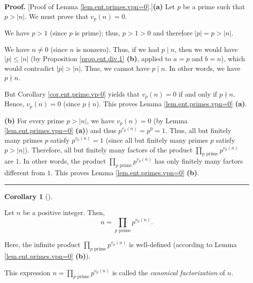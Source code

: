 \documentclass[numbers=enddot,12pt,final,onecolumn,notitlepage]{scrartcl}%
\numberwithin{exer}{subsection}
\theoremstyle{definition}
\newtheorem{coro}[theo]{Corollary}
\newenvironment{corollary}[1][]
{\begin{coro}[#1]\begin{leftbar}}
{\end{leftbar}\end{coro}}
\newenvironment{proof}[1][Proof]{\noindent\textbf{#1.} }{\ \rule{0.5em}{0.5em}}
\let\prodnonlimits\prod
\renewcommand{\prod}{\prodnonlimits\limits}
\begin{document}
\begin{proof}
[Proof of Lemma \ref{lem.ent.primes.vpn=0}.]\textbf{(a)} Let $p$ be a prime
such that $p>\left\vert n\right\vert $. We must prove that $v_{p}\left(
n\right)  =0$.

We have $p>1$ (since $p$ is prime); thus, $p>1>0$ and therefore $\left\vert
p\right\vert =p>\left\vert n\right\vert $.

We have $n\neq0$ (since $n$ is nonzero). Thus, if we had $p\mid n$, then we
would have $\left\vert p\right\vert \leq\left\vert n\right\vert $ (by
Proposition \ref{prop.ent.div.1} \textbf{(b)}, applied to $a=p$ and $b=n$),
which would contradict $\left\vert p\right\vert >\left\vert n\right\vert $.
Thus, we cannot have $p\mid n$. In other words, we have $p\nmid n$.

But Corollary \ref{cor.ent.prime.vp-0} yields that $v_{p}\left(  n\right)  =0$
if and only if $p\nmid n$. Hence, $v_{p}\left(  n\right)  =0$ (since $p\nmid
n$). This proves Lemma \ref{lem.ent.primes.vpn=0} \textbf{(a)}.

\textbf{(b)} For every prime $p>\left\vert n\right\vert $, we have
$v_{p}\left(  n\right)  =0$ (by Lemma \ref{lem.ent.primes.vpn=0} \textbf{(a)})
and thus $p^{v_{p}\left(  n\right)  }=p^{0}=1$. Thus, all but finitely many
primes $p$ satisfy $p^{v_{p}\left(  n\right)  }=1$ (since all but finitely
many primes $p$ satisfy $p>\left\vert n\right\vert $). Therefore, all but
finitely many factors of the product $\prod_{p\text{ prime}}p^{v_{p}\left(
n\right)  }$ are $1$. In other words, the product $\prod_{p\text{ prime}%
}p^{v_{p}\left(  n\right)  }$ has only finitely many factors different from
$1$. This proves Lemma \ref{lem.ent.primes.vpn=0} \textbf{(b)}.
\end{proof}

\begin{corollary}
\label{cor.ent.primes.can-fac}Let $n$ be a positive integer. Then,%
\[
n=\prod_{p\text{ prime}}p^{v_{p}\left(  n\right)  }.
\]


Here, the infinite product $\prod_{p\text{ prime}}p^{v_{p}\left(  n\right)  }$
is well-defined (according to Lemma \ref{lem.ent.primes.vpn=0} \textbf{(b)}).
\end{corollary}

This expression $n=\prod_{p\text{ prime}}p^{v_{p}\left(  n\right)  }$ is
called the \textit{canonical factorization} of $n$.
\end{document}
